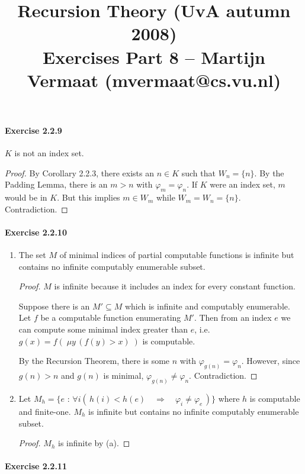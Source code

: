 \documentclass[a4paper,11pt]{article}
\title{Recursion Theory (UvA autumn 2008)\\
\normalsize{Exercises Part 8 -- Martijn Vermaat (mvermaat@cs.vu.nl)}}
\date{}
\begin{document}
\maketitle


\paragraph{Exercise 2.2.9}

$K$ is not an index set.

\begin{proof}
By Corollary 2.2.3, there exists an $n \in K$ such that $W_n = \{n\}$.
By the Padding Lemma, there is an $m > n$ with $\varphi_m = \varphi_n$.
If $K$ were an index set, $m$ would be in $K$.
But this implies $m \in W_m$ while $W_m = W_n = \{n\}$.
Contradiction.
\end{proof}


\paragraph{Exercise 2.2.10}

\begin{enumerate}[label=(\alph*)]

\item
The set $M$ of minimal indices of partial computable functions
is infinite but contains no infinite computably enumerable subset.

\begin{proof}
$M$ is infinite because it includes an index for every constant function.

Suppose there is an $M' \subseteq M$ which is infinite and computably enumerable.
Let $f$ be a computable function enumerating $M'$.
Then from an index $e$ we can compute some minimal index greater than $e$, i.e.
$g(x) = f( \; \mu y \, (f(y) > x) \; )$ is computable.

By the Recursion Theorem, there is some $n$ with $\varphi_{g(n)} = \varphi_n$.
However, since $g(n) > n$ and $g(n)$ is minimal, $\varphi_{g(n)} \neq \varphi_n$.
Contradiction.
\end{proof}

\item
Let $M_h = \{ e \text{ : } \forall i ( \, h(i) < h(e) \quad \Rightarrow \quad \varphi_i \neq \varphi_e \, ) \}$
where $h$ is computable and finite-one.
$M_h$ is infinite but contains no infinite computably enumerable subset.

\begin{proof}
$M_h$ is infinite by (a).

\end{proof}

\end{enumerate}


\paragraph{Exercise 2.2.11}
\end{document}
